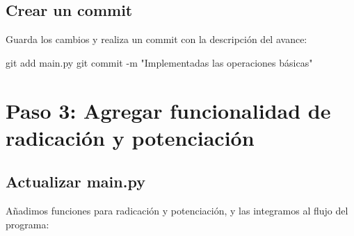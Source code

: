 \documentclass[
  a4paper,
  DIV=11,
  numbers=noendperiod,
  onepage,
  openany]{scrreprt}
\newenvironment{Shaded}{\begin{snugshade}}{\end{snugshade}}
\newcommand{\AttributeTok}[1]{\textcolor[rgb]{0.40,0.45,0.13}{#1}}
\newcommand{\FunctionTok}[1]{\textcolor[rgb]{0.28,0.35,0.67}{#1}}
\newcommand{\NormalTok}[1]{\textcolor[rgb]{0.00,0.23,0.31}{#1}}
\newcommand{\StringTok}[1]{\textcolor[rgb]{0.13,0.47,0.30}{#1}}
\begin{document}
\subsection{Crear un commit}\label{crear-un-commit}

Guarda los cambios y realiza un commit con la descripción del avance:

\begin{Shaded}
\begin{Highlighting}[]
\FunctionTok{git}\NormalTok{ add main.py}
\FunctionTok{git}\NormalTok{ commit }\AttributeTok{{-}m} \StringTok{"Implementadas las operaciones básicas"}
\end{Highlighting}
\end{Shaded}

\section{Paso 3: Agregar funcionalidad de radicación y
potenciación}\label{paso-3-agregar-funcionalidad-de-radicaciuxf3n-y-potenciaciuxf3n}

\subsection{Actualizar main.py}\label{actualizar-main.py}

Añadimos funciones para radicación y potenciación, y las integramos al
flujo del programa:
\end{document}
